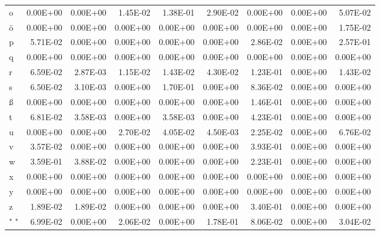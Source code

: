 \documentclass[11pt,a4paper]{CLabBookTemplate} %
\begin{document}
\begin{table}[htbp]
\begin{tabular}{lrrrrrrrr}
		o     & 0.00E+00 & 0.00E+00 & 1.45E-02 & 1.38E-01 & 2.90E-02 & 0.00E+00 & 0.00E+00 & 5.07E-02 \\
		ö     & 0.00E+00 & 0.00E+00 & 0.00E+00 & 0.00E+00 & 0.00E+00 & 0.00E+00 & 0.00E+00 & 1.75E-02 \\
		p     & 5.71E-02 & 0.00E+00 & 0.00E+00 & 0.00E+00 & 0.00E+00 & 2.86E-02 & 0.00E+00 & 2.57E-01 \\
		q     & 0.00E+00 & 0.00E+00 & 0.00E+00 & 0.00E+00 & 0.00E+00 & 0.00E+00 & 0.00E+00 & 0.00E+00 \\
		r     & 6.59E-02 & 2.87E-03 & 1.15E-02 & 1.43E-02 & 4.30E-02 & 1.23E-01 & 0.00E+00 & 1.43E-02 \\
		s     & 6.50E-02 & 3.10E-03 & 0.00E+00 & 1.70E-01 & 0.00E+00 & 8.36E-02 & 0.00E+00 & 0.00E+00 \\
		ß     & 0.00E+00 & 0.00E+00 & 0.00E+00 & 0.00E+00 & 0.00E+00 & 1.46E-01 & 0.00E+00 & 0.00E+00 \\
		t     & 6.81E-02 & 3.58E-03 & 0.00E+00 & 3.58E-03 & 0.00E+00 & 4.23E-01 & 0.00E+00 & 0.00E+00 \\
		u     & 0.00E+00 & 0.00E+00 & 2.70E-02 & 4.05E-02 & 4.50E-03 & 2.25E-02 & 0.00E+00 & 6.76E-02 \\
		v     & 3.57E-02 & 0.00E+00 & 0.00E+00 & 0.00E+00 & 0.00E+00 & 3.93E-01 & 0.00E+00 & 0.00E+00 \\
		w     & 3.59E-01 & 3.88E-02 & 0.00E+00 & 0.00E+00 & 0.00E+00 & 2.23E-01 & 0.00E+00 & 0.00E+00 \\
		x     & 0.00E+00 & 0.00E+00 & 0.00E+00 & 0.00E+00 & 0.00E+00 & 0.00E+00 & 0.00E+00 & 0.00E+00 \\
		y     & 0.00E+00 & 0.00E+00 & 0.00E+00 & 0.00E+00 & 0.00E+00 & 0.00E+00 & 0.00E+00 & 0.00E+00 \\
		z     & 1.89E-02 & 1.89E-02 & 0.00E+00 & 0.00E+00 & 0.00E+00 & 3.40E-01 & 0.00E+00 & 0.00E+00 \\
		" "   & 6.99E-02 & 0.00E+00 & 2.06E-02 & 0.00E+00 & 1.78E-01 & 8.06E-02 & 0.00E+00 & 3.04E-02 \\
	\end{tabular}%
	\label{tab:ProbTrans1}%
\end{table}%
\end{document}

